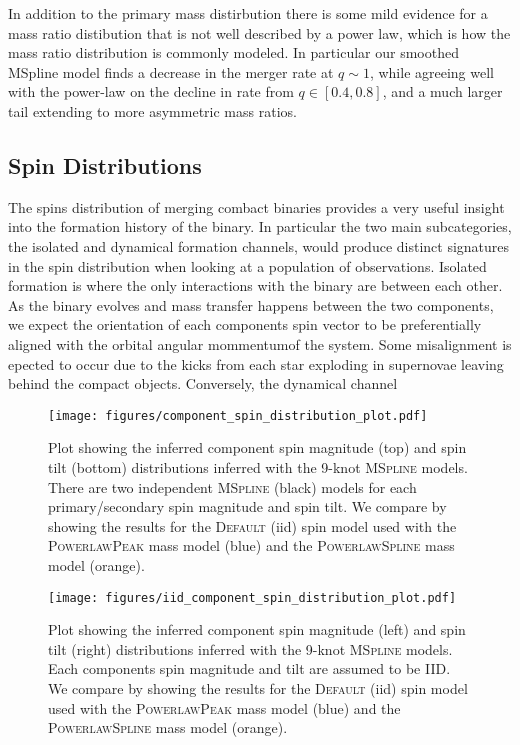 In addition to the primary mass distirbution there is some mild evidence for a mass ratio distibution that is not well described by a power law, 
which is how the mass ratio distribution is commonly modeled. In particular our smoothed MSpline model finds a decrease in the merger rate at $q\sim1$, 
while agreeing well with the power-law on the decline in rate from $q \in [0.4, 0.8]$, and a much larger tail extending to more asymmetric
mass ratios. 

\subsection{Spin Distributions} \label{sec:spin_dist}

The spins distribution of merging combact binaries provides a very useful insight into the formation history of the binary. In particular the two main subcategories, 
the isolated and dynamical formation channels, would produce distinct signatures in the spin distribution when looking at a population of observations. Isolated formation
is where the only interactions with the binary are between each other. As the binary evolves and mass transfer happens between the two components, we expect the orientation
of each components spin vector to be preferentially aligned with the orbital angular mommentumof the system. Some misalignment is epected to occur due to the kicks from 
each star exploding in supernovae leaving behind the compact objects. Conversely, the dynamical channel     

\begin{figure*}[ht!]
    \begin{centering}
        \texttt{[image: figures/component\_spin\_distribution\_plot.pdf]}
        \caption{Plot showing the inferred component spin magnitude (top) and spin tilt (bottom) distributions inferred with the 9-knot \textsc{MSpline} models. 
        There are two independent \textsc{MSpline} (black) models for each primary/secondary spin magnitude and spin tilt. We compare by showing the results for the
        \textsc{Default} (iid) spin model used with the \textsc{PowerlawPeak} mass model (blue) and the \textsc{PowerlawSpline} mass model (orange).}
        \label{fig:component_spin_distribution}
    \end{centering}
\end{figure*}

\begin{figure*}
    \begin{centering}
        \texttt{[image: figures/iid\_component\_spin\_distribution\_plot.pdf]}
        \caption{Plot showing the inferred component spin magnitude (left) and spin tilt (right) distributions inferred with the 9-knot \textsc{MSpline} models. 
        Each components spin magnitude and tilt are assumed to be IID. We compare by showing the results for the
        \textsc{Default} (iid) spin model used with the \textsc{PowerlawPeak} mass model (blue) and the \textsc{PowerlawSpline} mass model (orange).}
        \label{fig:iid_component_spin_distribution}
    \end{centering}
\end{figure*}